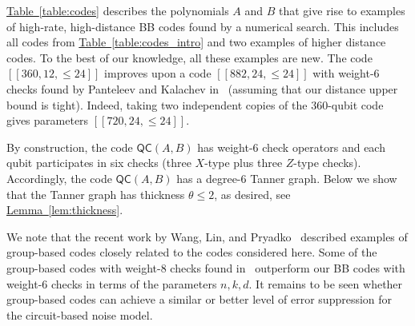 \documentclass{article}
\newcommand{\qc}{\mathsf{QC}(A,B)}
\newcommand{\tab}[1]{\hyperref[table:#1]{Table~\ref*{table:#1}}}
\newcommand{\lem}[1]{\hyperref[lem:#1]{Lemma~\ref*{lem:#1}}}
\begin{document}
\tab{codes} describes the polynomials $A$ and $B$ that give rise to examples of high-rate, high-distance  BB codes found by a numerical search. 
This includes all codes from \tab{codes_intro} and two examples of higher distance codes. 
To the best of our knowledge,
all these examples are new. 
The code $[[360,12,\le 24]]$  improves upon a code  $[[882,24,\le 24]]$ with weight-6 checks found by Panteleev and Kalachev in~\cite{panteleev2021degenerate} (assuming that our distance upper bound is  tight). Indeed, taking two independent copies of the 360-qubit code gives parameters $[[720,24,\le 24]]$.


By construction, the  code $\qc$ has 
weight-6 check operators and each qubit participates in six checks
(three $X$-type plus three $Z$-type checks). 
Accordingly, the  code $\qc$ has a degree-$6$ Tanner graph.
Below we show that the Tanner graph  has thickness $\theta\le 2$, as desired, see \lem{thickness}. 

We note that the recent work by Wang, Lin, and Pryadko~\cite{wang2023abelian,lin2023quantum}
described examples of group-based codes closely related to the codes considered here. Some of the group-based codes with weight-8 checks found in~\cite{lin2023quantum} outperform our BB codes with weight-6 checks in terms of the parameters $n,k,d$.
It remains to be seen whether group-based codes can achieve a similar or better level of error suppression for the circuit-based noise model.  
\end{document}
